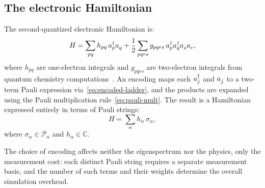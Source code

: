\subsection{The electronic Hamiltonian}
\label{sec:hamiltonian}

The second-quantized electronic Hamiltonian is:
\begin{equation}
  H = \sum_{pq} h_{pq}\, \ad{p}\an{q}
    + \frac{1}{2} \sum_{pqrs} g_{pqrs}\, \ad{p}\ad{q}\an{s}\an{r},
  \label{eq:hamiltonian}
\end{equation}
where $h_{pq}$ are one-electron integrals and $g_{pqrs}$ are
two-electron integrals from quantum chemistry
computations~\cite{szabo1996, helgaker2000}.  An encoding maps each
$a_{j}^{\dagger}$ and $\an{j}$ to a two-term Pauli expression
via~\eqref{eq:encoded-ladder}, and the products are expanded using the
Pauli multiplication rule~\eqref{eq:pauli-mult}.  The result is a
Hamiltonian expressed entirely in terms of Pauli strings:
\begin{equation}
  H = \sum_{\alpha} h_\alpha\, \sigma_\alpha,
  \label{eq:pauli-hamiltonian}
\end{equation}
where $\sigma_\alpha \in \mathcal{P}_n$ and $h_\alpha \in \mathbb{C}$.

The choice of encoding affects neither the eigenspectrum nor the
physics, only the measurement cost: each distinct Pauli string
requires a separate measurement basis, and the number of such terms
and their weights determine the overall simulation overhead.
